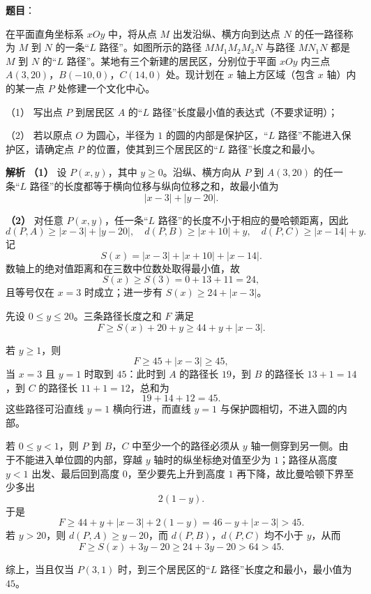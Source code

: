 \begin{answer}

\textbf{题目}：

在平面直角坐标系 $xOy$ 中，将从点 $M$ 出发沿纵、横方向到达点 $N$ 的任一路径称为 $M$ 到 $N$ 的一条“$L$ 路径”。如图所示的路径 $MM_1M_2M_3N$ 与路径 $MN_1N$ 都是 $M$ 到 $N$ 的“$L$ 路径”。某地有三个新建的居民区，分别位于平面 $xOy$ 内三点 $A(3,20)$，$B(-10,0)$，$C(14,0)$ 处。现计划在 $x$ 轴上方区域（包含 $x$ 轴）内的某一点 $P$ 处修建一个文化中心。

（1） 写出点 $P$ 到居民区 $A$ 的“$L$ 路径”长度最小值的表达式（不要求证明）；

（2） 若以原点 $O$ 为圆心，半径为 $1$ 的圆的内部是保护区，“$L$ 路径”不能进入保护区，请确定点 $P$ 的位置，使其到三个居民区的“$L$ 路径”长度之和最小。
\nopagebreak[4]
\begin{center}\end{center}
\nopagebreak[4]
\textbf{解析}
\textbf{（1）} 设 $P(x,y)$，其中 $y\geqslant0$。沿纵、横方向从 $P$ 到 $A(3,20)$ 的任一条“$L$ 路径”的长度都等于横向位移与纵向位移之和，故最小值为
\nopagebreak[4]
\[|x-3|+|y-20|.\]

\textbf{（2）} 对任意 $P(x,y)$，任一条“$L$ 路径”的长度不小于相应的曼哈顿距离，因此
\nopagebreak[4]
\[d(P,A)\geqslant|x-3|+|y-20|,\quad
d(P,B)\geqslant|x+10|+y,\quad
d(P,C)\geqslant|x-14|+y.\]
记
\nopagebreak[4]
\[S(x)=|x-3|+|x+10|+|x-14|.\]
数轴上的绝对值距离和在三数中位数处取得最小值，故
\nopagebreak[4]
\[S(x)\geqslant S(3)=0+13+11=24,\]
且等号仅在 $x=3$ 时成立；进一步有 $S(x)\geqslant24+|x-3|$。

先设 $0\leqslant y\leqslant20$。三条路径长度之和 $F$ 满足
\nopagebreak[4]
\[F\geqslant S(x)+20+y\geqslant44+y+|x-3|.\]

若 $y\geqslant1$，则
\nopagebreak[4]
\[F\geqslant45+|x-3|\geqslant45,\]
当 $x=3$ 且 $y=1$ 时取到 $45$：此时到 $A$ 的路径长 $19$，到 $B$ 的路径长 $13+1=14$，到 $C$ 的路径长 $11+1=12$，总和为
\nopagebreak[4]
\[19+14+12=45.\]
这些路径可沿直线 $y=1$ 横向行进，而直线 $y=1$ 与保护圆相切，不进入圆的内部。

若 $0\leqslant y<1$，则 $P$ 到 $B$，$C$ 中至少一个的路径必须从 $y$ 轴一侧穿到另一侧。由于不能进入单位圆的内部，穿越 $y$ 轴时的纵坐标绝对值至少为 $1$；路径从高度 $y<1$ 出发、最后回到高度 $0$，至少要先上升到高度 $1$ 再下降，故比曼哈顿下界至少多出
\nopagebreak[4]
\[2(1-y).\]
于是
\nopagebreak[4]
\[F\geqslant44+y+|x-3|+2(1-y)
=46-y+|x-3|>45.\]
若 $y>20$，则 $d(P,A)\geqslant y-20$，而 $d(P,B)$，$d(P,C)$ 均不小于 $y$，从而
\nopagebreak[4]
\[F\geqslant S(x)+3y-20\geqslant24+3y-20>64>45.\]

综上，当且仅当 $P(3,1)$ 时，到三个居民区的“$L$ 路径”长度之和最小，最小值为 $45$。



\end{answer}
